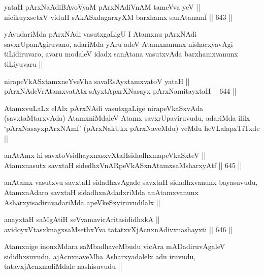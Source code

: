 \begin{shl}
yataH pArxNaAdiBAvoV\s yaM pArxNAdiVnAM tameVva yeV || \\
nicikuyxsetxV viduH sAkASxdagarxyXM barxhamx sanAtanamf ||  643 ||  
\end{shl}

\begin{artha}
yAvudariMda pArxNAdi vasutxgaLigU I Atamxnu pArxNAdi
savxrUpanAgiruvano, adariMda yAru adeV Atamxnanunx nishacxyavAgi
tiLidiruvaro, avaru modaleV idadx sanAtana vasutxvAda barxhamxvanunx
tiLiyuvaru ||
\end{artha}

\begin{shl}
nirapeVkASxtamxneYveVha savaRsAyx\s \s tamxvatoV yataH || \\
pArxNAdeVrAtamxvatAtx sAyxtApxrXNasayx pArxNamitayxtaH ||  644 ||  
\end{shl}

\begin{artha}
AtamxvuLaLx elAlx pArxNAdi vasutxgaLige nirapeVkaSxvAda
(savxtaMtarxvAda) AtamxniMdaleV Atamx savxrUpaviruvudu, adariMda ililx
`pArxNasayxpArxNAmf' (pArxNakUkx pArxNaveMdu) veMdu heVLalapxTiTxde ||
\end{artha}

\begin{shl}
anAtAmx hi savxtoV\s sidhayxnasxvXtaHsidadhxmapeVkaSxteV || \\
Atamxnasutx savxtaH sidedhxVnARpeVkASx\s nAtamxsaMsharxyAtf ||  645 ||  
\end{shl}

\begin{artha}
anAtamx vasutxvu savxtaH sidadhxvAgade savxtaH sidadhxvanunx
bayasuvudu, AtamxnAdaro savxtaH sidadhxnAdadxriMda anAtamxvanunx
AsharxyisadiruvadariMda apeVkeSxyiruvudilalx ||
\end{artha}


\begin{shl}
anayxtaH saMgAtiH seVvamavicAritasididhxkA || \\
avidoyxVtasxknagxsaMsethxYva tatatxvXjAcnxnAdivxnashayxti ||  646 ||  
\end{shl}

\begin{artha}
Atamxnige inonxMdara saMbadhaveMbudu vicAra mADadiruvAgaleV
sididhxsuvudu, ajAcnxnaveMba Asharxyadalelx adu iruvudu,
tatavxjAcnxnadiMdale nashisuvudu || 
\end{artha}

